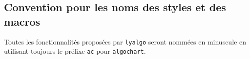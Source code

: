 \documentclass[12pt,a4paper]{article}
\begin{document}

\subsection{Convention pour les noms des styles et des macros}

Toutes les fonctionnalités proposées par \verb+lyalgo+ seront nommées en minuscule en utilisant toujours le préfixe \verb+ac+ pour \verb+algochart+.
\end{document}
